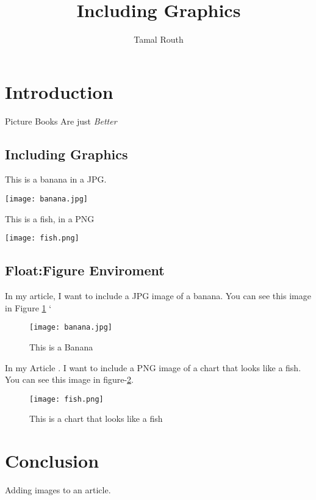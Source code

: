 \documentclass{proc}
\title{Including Graphics}
\author{Tamal Routh}
\date{}
\begin{document}
\maketitle

\section{Introduction}

Picture Books Are just \emph{Better}


\subsection{Including Graphics}

This is a banana in a JPG.

\bigskip

\texttt{[image: banana.jpg]}  %

This is a fish, in a PNG

\texttt{[image: fish.png]}

\subsection{Float:Figure Enviroment}

In my article, I want to include a JPG image of a banana. You can see this image in Figure \ref{fg:Banana}
`
\begin{figure}[htbp]
\begin{center}
\texttt{[image: banana.jpg]}
\caption{This is a Banana}
\label{fg:Banana}
\end{center}
\end{figure}

In my Article . I want to include a PNG image of a chart that looks like a fish. You can see this image in figure-\ref{fg:Fish}.

\begin{figure}[htbp]
\begin{center}
\texttt{[image: fish.png]}
\caption{This is a chart that looks like a fish}
\label{fg:Fish}
\end{center}
\end{figure}

\section{Conclusion}

Adding images to an article.
\end{document}
